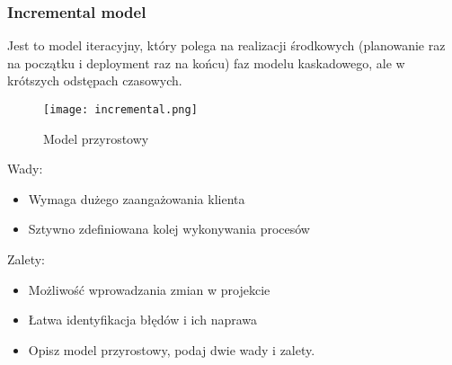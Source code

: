 \documentclass[a4paper,15pt]{article}
\newcommand{\definition}[2]{
    \begin{tcolorbox}[colback=gray!5!white,colframe=gray,title={Definicja -  #1}]
        #2
    \end{tcolorbox}
}
\begin{document}
\newpage
\subsubsection{Incremental model}


\definition{Model przyrostowy}{
Jest to model iteracyjny, który polega na realizacji środkowych (planowanie raz na początku i deployment raz na końcu) faz modelu kaskadowego, ale w krótszych odstępach czasowych.
\begin{figure}[H]
\centerline{\texttt{[image: incremental.png]}}
\caption{Model przyrostowy}
\label{fig:ANTIinhibitor}
\end{figure}

}

\begin{tcolorbox}[colback=red!5!white,colframe=red!75!black]
  Wady:
  \begin{itemize}
  	\item Wymaga dużego zaangażowania klienta
  	\item Sztywno zdefiniowana kolej wykonywania procesów
  \end{itemize}
\end{tcolorbox}

\begin{tcolorbox}[colback=green!5!white,colframe=green!75!black]
  Zalety:
  \begin{itemize}
  	\item Możliwość wprowadzania zmian w projekcie
  	\item Łatwa identyfikacja błędów i ich naprawa
  \end{itemize}
\end{tcolorbox}


\begin{framed}
\begin{itemize}
\item Opisz model przyrostowy, podaj dwie wady i zalety.
\end{itemize}
\end{framed}
\end{document}
